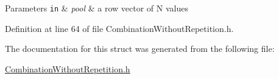 \begin{DoxyParams}[1]{Parameters}
\mbox{\tt in}  & {\em pool} & a row vector of N values\\
\hline
\end{DoxyParams}


Definition at line 64 of file Combination\+Without\+Repetition.\+h.



The documentation for this struct was generated from the following file\+:\begin{DoxyCompactItemize}
\item 
\hyperlink{_combination_without_repetition_8h}{Combination\+Without\+Repetition.\+h}\end{DoxyCompactItemize}
